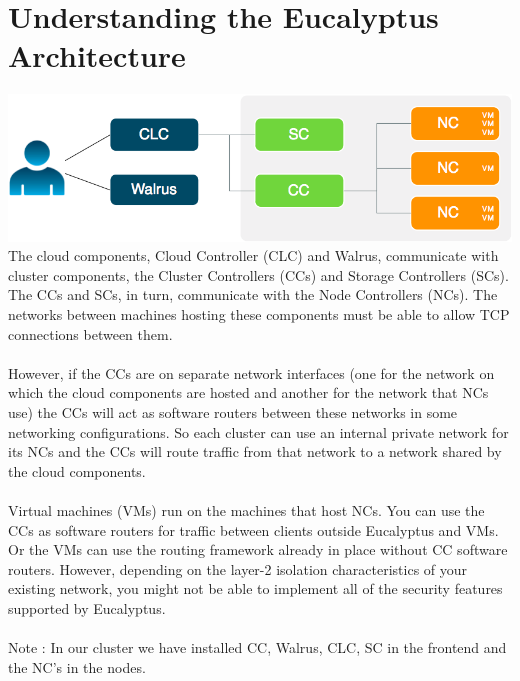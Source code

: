 \section{Understanding the Eucalyptus Architecture}
\includegraphics[scale=0.75]{euca-arch.png} 
\linebreak
The cloud components, Cloud Controller (CLC) and Walrus, communicate with cluster components, the Cluster Controllers (CCs) and Storage Controllers (SCs). The CCs and SCs, in turn, communicate with the Node Controllers (NCs). The networks between machines hosting these components must be able to allow TCP connections between them.
\\ \\
However, if the CCs are on separate network interfaces (one for the network on which the cloud components are hosted and another for the network that NCs use) the CCs will act as software routers between these networks in some networking configurations. So each cluster can use an internal private network for its NCs and the CCs will route traffic from that network to a network shared by the cloud components.
\\ \\
Virtual machines (VMs) run on the machines that host NCs. You can use the CCs as software routers for traffic between clients outside Eucalyptus and VMs. Or the VMs can use the routing framework already in place without CC software routers. However, depending on the layer-2 isolation characteristics of your existing network, you might not be able to implement all of the security features supported by Eucalyptus. 
\\ \\
Note : In our cluster we have installed CC, Walrus, CLC, SC in the frontend and the NC’s in the nodes.




